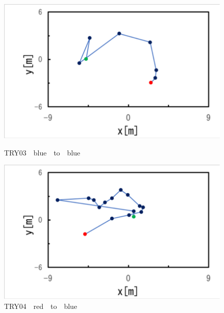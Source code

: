 \begin{figure}[ht]
  \begin{center}

    
    \includegraphics[clip,width=15.0cm]{figure/TRY03_blue_to_blue.eps}
    \caption{TRY03　blue　to　blue}
    \label{fig:try03}
    
    \includegraphics[width=15.0cm]{figure/TRY04_red_to_blue.eps}
    \caption{TRY04　red　to　blue}
    \label{ig:try04}

  \end{center}
\end{figure}

